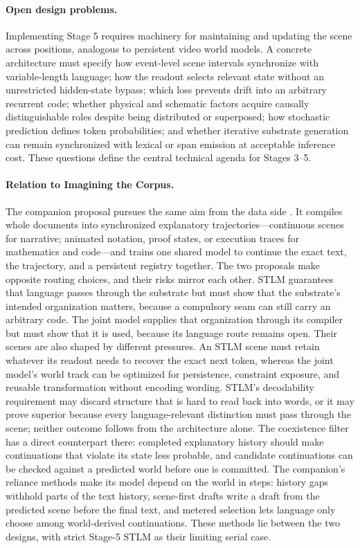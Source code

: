 \documentclass[11pt,a4paper]{article}
\begin{document}
\paragraph{Open design problems.} Implementing Stage 5 requires machinery for maintaining and updating the scene across positions, analogous to persistent video world models. A concrete architecture must specify how event-level scene intervals synchronize with variable-length language; how the readout selects relevant state without an unrestricted hidden-state bypass; which loss prevents drift into an arbitrary recurrent code; whether physical and schematic factors acquire causally distinguishable roles despite being distributed or superposed; how stochastic prediction defines token probabilities; and whether iterative substrate generation can remain synchronized with lexical or span emission at acceptable inference cost. These questions define the central technical agenda for Stages 3--5.

\paragraph{Relation to Imagining the Corpus.} The companion proposal pursues the same aim from the data side \cite{documentworld2026}. It compiles whole documents into synchronized explanatory trajectories---continuous scenes for narrative; animated notation, proof states, or execution traces for mathematics and code---and trains one shared model to continue the exact text, the trajectory, and a persistent registry together. The two proposals make opposite routing choices, and their risks mirror each other. STLM guarantees that language passes through the substrate but must show that the substrate's intended organization matters, because a compulsory seam can still carry an arbitrary code. The joint model supplies that organization through its compiler but must show that it is used, because its language route remains open. Their scenes are also shaped by different pressures. An STLM scene must retain whatever its readout needs to recover the exact next token, whereas the joint model's world track can be optimized for persistence, constraint exposure, and reusable transformation without encoding wording. STLM's decodability requirement may discard structure that is hard to read back into words, or it may prove superior because every language-relevant distinction must pass through the scene; neither outcome follows from the architecture alone. The coexistence filter has a direct counterpart there: completed explanatory history should make continuations that violate its state less probable, and candidate continuations can be checked against a predicted world before one is committed. The companion's reliance methods make its model depend on the world in steps: history gaps withhold parts of the text history, scene-first drafts write a draft from the predicted scene before the final text, and metered selection lets language only choose among world-derived continuations. These methods lie between the two designs, with strict Stage-5 STLM as their limiting serial case.
\end{document}
